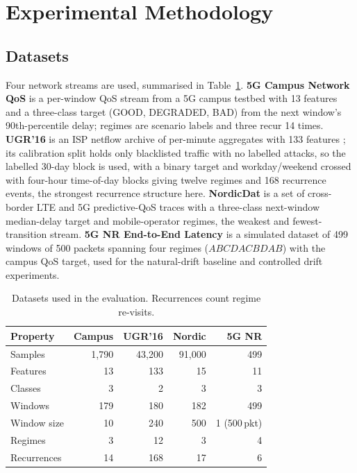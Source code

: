 \documentclass[conference]{IEEEtran}
\begin{document}
\section{Experimental Methodology}
\label{sec:protocol}

\subsection{Datasets}
Four network streams are used, summarised in Table~\ref{tab:datasets}.
\textbf{5G Campus Network QoS} is a per-window QoS stream from a 5G campus testbed
with 13 features and a three-class target (GOOD, DEGRADED, BAD) from the next
window's 90th-percentile delay; regimes are scenario labels and three recur 14 times.
\textbf{UGR'16} is an ISP netflow archive of per-minute aggregates with 133 features
\cite{ugr16}; its calibration split holds only blacklisted traffic with no labelled
attacks, so the labelled 30-day block is used, with a binary target and
workday/weekend crossed with four-hour time-of-day blocks giving twelve regimes and
168 recurrence events, the strongest recurrence structure here. \textbf{NordicDat}
is a set of cross-border LTE and 5G predictive-QoS traces \cite{nordicdat} with a
three-class next-window median-delay target and mobile-operator regimes, the weakest
and fewest-transition stream. \textbf{5G NR End-to-End Latency} is a simulated dataset
\cite{nrlatency} of 499 windows of 500 packets spanning four regimes ($ABCDACBDAB$)
with the campus QoS target, used for the natural-drift baseline and controlled drift
experiments.

\begin{table}[t]
\caption{Datasets used in the evaluation. Recurrences count regime re-visits.}
\label{tab:datasets}
\centering
\footnotesize
\begin{tabular}{@{}lrrrr@{}}
\toprule
\textbf{Property} & \textbf{Campus} & \textbf{UGR'16} & \textbf{Nordic} & \textbf{5G NR} \\
\midrule
Samples     & 1{,}790  & 43{,}200 & 91{,}000 & 499 \\
Features    & 13       & 133      & 15       & 11 \\
Classes     & 3        & 2        & 3        & 3 \\
Windows     & 179      & 180      & 182      & 499 \\
Window size & 10       & 240      & 500      & 1 (500\,pkt) \\
Regimes     & 3        & 12       & 3        & 4 \\
Recurrences & 14       & 168      & 17       & 6 \\
\bottomrule
\end{tabular}
\end{table}
\end{document}
